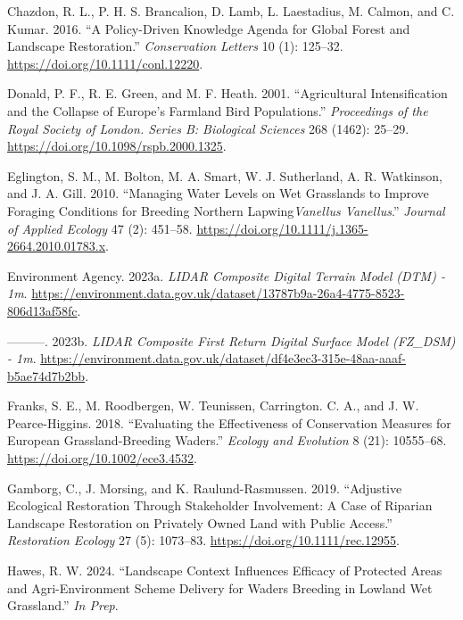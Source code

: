 \documentclass[
  12pt,
  letterpaper,
  DIV=11,
  numbers=noendperiod]{scrartcl}
\newlength{\cslhangindent}
\newenvironment{CSLReferences}[2] %
 {\begin{list}{}{%
  \setlength{\itemindent}{0pt}
  \setlength{\leftmargin}{0pt}
  \setlength{\parsep}{0pt}
  \ifodd #1
   \setlength{\leftmargin}{\cslhangindent}
   \setlength{\itemindent}{-1\cslhangindent}
  \fi
  \setlength{\itemsep}{#2\baselineskip}}}
 {\end{list}}
\begin{document}
\label{refs}
\begin{CSLReferences}{1}{0}
Chazdon, R. L., P. H. S. Brancalion, D. Lamb, L. Laestadius, M. Calmon,
and C. Kumar. 2016. {``A Policy{-}Driven Knowledge Agenda for Global
Forest and Landscape Restoration.''} \emph{Conservation Letters} 10 (1):
125--32. \url{https://doi.org/10.1111/conl.12220}.

Donald, P. F., R. E. Green, and M. F. Heath. 2001. {``Agricultural
Intensification and the Collapse of Europe's Farmland Bird
Populations.''} \emph{Proceedings of the Royal Society of London. Series
B: Biological Sciences} 268 (1462): 25--29.
\url{https://doi.org/10.1098/rspb.2000.1325}.

Eglington, S. M., M. Bolton, M. A. Smart, W. J. Sutherland, A. R.
Watkinson, and J. A. Gill. 2010. {``Managing Water Levels on Wet
Grasslands to Improve Foraging Conditions for Breeding Northern
Lapwing{\emph{Vanellus Vanellus}}.''} \emph{Journal of Applied Ecology}
47 (2): 451--58. \url{https://doi.org/10.1111/j.1365-2664.2010.01783.x}.

Environment Agency. 2023a. \emph{LIDAR Composite Digital Terrain Model
(DTM) - 1m}.
\url{https://environment.data.gov.uk/dataset/13787b9a-26a4-4775-8523-806d13af58fc}.

---------. 2023b. \emph{LIDAR Composite First Return Digital Surface
Model (FZ\_DSM) - 1m}.
\url{https://environment.data.gov.uk/dataset/df4e3ec3-315e-48aa-aaaf-b5ae74d7b2bb}.

Franks, S. E., M. Roodbergen, W. Teunissen, Carrington. C. A., and J. W.
Pearce-Higgins. 2018. {``Evaluating the Effectiveness of Conservation
Measures for European Grassland{-}Breeding Waders.''} \emph{Ecology and
Evolution} 8 (21): 10555--68. \url{https://doi.org/10.1002/ece3.4532}.

Gamborg, C., J. Morsing, and K. Raulund-Rasmussen. 2019. {``Adjustive
Ecological Restoration Through Stakeholder Involvement: A Case of
Riparian Landscape Restoration on Privately Owned Land with Public
Access.''} \emph{Restoration Ecology} 27 (5): 1073--83.
\url{https://doi.org/10.1111/rec.12955}.

Hawes, R. W. 2024. {``Landscape Context Influences Efficacy of Protected
Areas and Agri-Environment Scheme Delivery for Waders Breeding in
Lowland Wet Grassland.''} \emph{In Prep}.


\end{CSLReferences}
\end{document}
